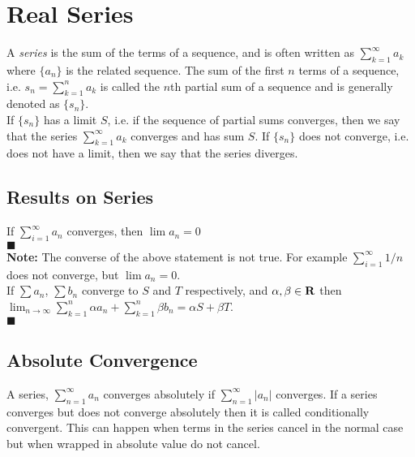 \section{Real Series}
  A \emph{series} is the sum of the terms of a sequence, and is often written as 
  $\sum_{k=1}^{\infty} a_k$ where $\{a_n\}$ is the related sequence. The sum of the
  first $n$ terms of a sequence, i.e. $s_n = \sum_{k=1}^n a_k$ is called the $n$th partial sum 
  of a sequence and is generally denoted as $\{s_n\}$.\\
  
  If $\{s_n\}$ has a limit $S$, i.e. if the sequence of partial sums converges, then we say 
  that the series $\sum_{k=1}^{\infty} a_k$ converges and has sum $S$. If $\{s_n\}$ does 
  not converge, i.e. does not have a limit, then we say that the series diverges.
  
  \subsection{Results on Series}
    \thm If $\sum_{i=1}^{\infty} a_n$ converges, then $\lim a_n = 0$\\

    \pf {}
    $\blacksquare$\\

    \textbf{Note:} The converse of the above statement is not true. For example 
    $\sum_{i=1}^{\infty} 1/n$ does not converge, but $\lim a_n =0$.\\

    \thm If $\sum a_n$, $\sum b_n$ converge to $S$ and $T$ respectively, and $\alpha, \beta \in 
    \mathbf{R}$ then $\lim_{n \to \infty} \sum_{k=1}^n \alpha a_n + \sum_{k=1}^n \beta b_n = \alpha 
    S + \beta T$.\\

    \pf {}
    $\blacksquare$
  \subsection{Absolute Convergence}
    A series, $\sum_{n=1}^{\infty} a_n$ converges absolutely if $\sum_{n=1}^{\infty} |a_n|$ 
    converges. If a series converges but does not converge absolutely then it is called 
    conditionally convergent. This can happen when terms in the series cancel in the normal case
    but when wrapped in absolute value do not cancel.\\


